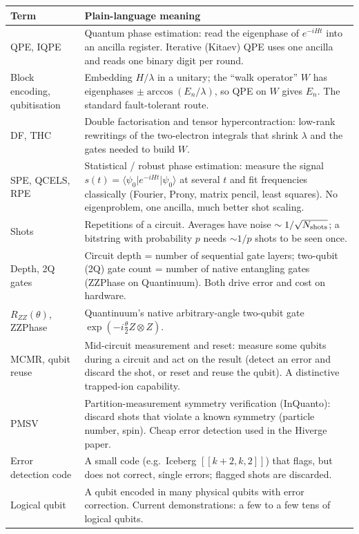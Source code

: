 \documentclass[11pt,a4paper]{article}
\newcommand{\ket}[1]{\lvert #1\rangle}
\newcommand{\bra}[1]{\langle #1\rvert}
\begin{document}
\begin{center}\small
\begin{tabularx}{\linewidth}{@{}L{3.4cm}Y@{}}
\toprule
Term & Plain-language meaning\\\midrule
QPE, IQPE & Quantum phase estimation: read the eigenphase of $e^{-iHt}$ into an ancilla register. Iterative (Kitaev) QPE uses one ancilla and reads one binary digit per round.\\
Block encoding, qubitisation & Embedding $H/\lambda$ in a unitary; the ``walk operator'' $W$ has eigenphases $\pm\arccos(E_n/\lambda)$, so QPE on $W$ gives $E_n$. The standard fault-tolerant route.\\
DF, THC & Double factorisation and tensor hypercontraction: low-rank rewritings of the two-electron integrals that shrink $\lambda$ and the gates needed to build $W$.\\
SPE, QCELS, RPE & Statistical / robust phase estimation: measure the signal $s(t)=\bra{\psi_0}e^{-iHt}\ket{\psi_0}$ at several $t$ and fit frequencies classically (Fourier, Prony, matrix pencil, least squares). No eigenproblem, one ancilla, much better shot scaling.\\
Shots & Repetitions of a circuit. Averages have noise $\sim 1/\sqrt{N_{\rm shots}}$; a bitstring with probability $p$ needs $\sim 1/p$ shots to be seen once.\\
Depth, 2Q gates & Circuit depth = number of sequential gate layers; two-qubit (2Q) gate count = number of native entangling gates (ZZPhase on Quantinuum). Both drive error and cost on hardware.\\
$R_{ZZ}(\theta)$, ZZPhase & Quantinuum's native arbitrary-angle two-qubit gate $\exp(-i\tfrac\theta2 Z\otimes Z)$.\\
MCMR, qubit reuse & Mid-circuit measurement and reset: measure some qubits during a circuit and act on the result (detect an error and discard the shot, or reset and reuse the qubit). A distinctive trapped-ion capability.\\
PMSV & Partition-measurement symmetry verification (InQuanto): discard shots that violate a known symmetry (particle number, spin). Cheap error detection used in the Hiverge paper.\\
Error detection code & A small code (e.g.\ Iceberg $[[k{+}2,k,2]]$) that flags, but does not correct, single errors; flagged shots are discarded.\\
Logical qubit & A qubit encoded in many physical qubits with error correction. Current demonstrations: a few to a few tens of logical qubits.\\

\end{tabularx}
\end{center}
\end{document}
